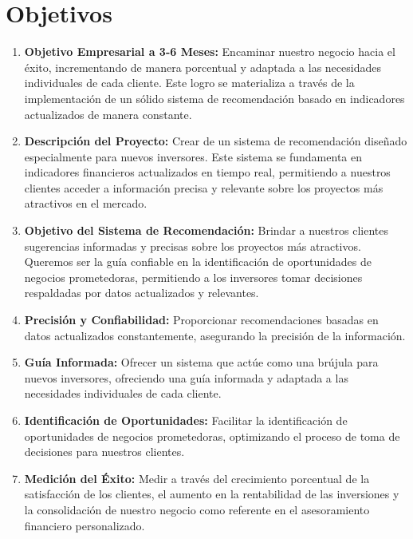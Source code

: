 \documentclass[12pt]{article}
\begin{document}
\section{Objetivos}
\begin{enumerate}
    \item \textbf{Objetivo Empresarial a 3-6 Meses:} Encaminar nuestro negocio hacia el éxito, incrementando de manera porcentual y adaptada a las necesidades individuales de cada cliente. Este logro se materializa a través de la implementación de un sólido sistema de recomendación basado en indicadores actualizados de manera constante.

    \item \textbf{Descripción del Proyecto:} Crear de un sistema de recomendación diseñado especialmente para nuevos inversores. Este sistema se fundamenta en indicadores financieros actualizados en tiempo real, permitiendo a nuestros clientes acceder a información precisa y relevante sobre los proyectos más atractivos en el mercado.

    \item \textbf{Objetivo del Sistema de Recomendación:} Brindar a nuestros clientes sugerencias informadas y precisas sobre los proyectos más atractivos. Queremos ser la guía confiable en la identificación de oportunidades de negocios prometedoras, permitiendo a los inversores tomar decisiones respaldadas por datos actualizados y relevantes.

    \item \textbf{Precisión y Confiabilidad:} Proporcionar recomendaciones basadas en datos actualizados constantemente, asegurando la precisión de la información.

    \item \textbf{Guía Informada:} Ofrecer un sistema que actúe como una brújula para nuevos inversores, ofreciendo una guía informada y adaptada a las necesidades individuales de cada cliente.

    \item  \textbf{Identificación de Oportunidades:} Facilitar la identificación de oportunidades de negocios prometedoras, optimizando el proceso de toma de decisiones para nuestros clientes.

    \item \textbf{Medición del Éxito:} Medir a través del crecimiento porcentual de la satisfacción de los clientes, el aumento en la rentabilidad de las inversiones y la consolidación de nuestro negocio como referente en el asesoramiento financiero personalizado.
\end{enumerate}
\end{document}
